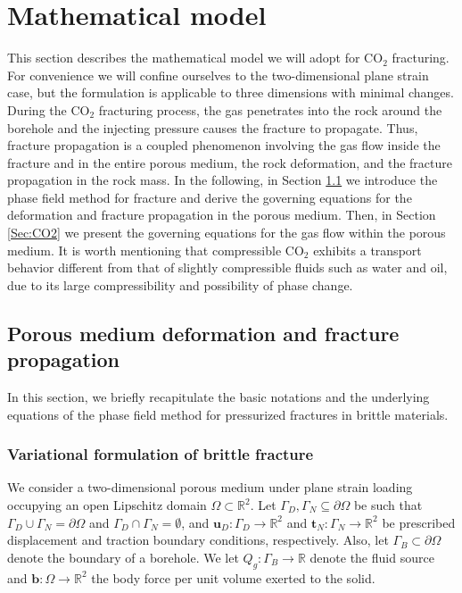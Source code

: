\section{Mathematical model}\label{sec:Math_model}
{This section describes the mathematical model we will adopt for CO$_2$ fracturing. For convenience we will confine ourselves to the two-dimensional plane strain case, but the formulation is applicable to three dimensions with minimal changes.}
During the CO$_2$ fracturing process, the gas penetrates into the rock around the borehole and the injecting pressure causes the fracture to propagate. Thus, fracture propagation is a coupled phenomenon involving the gas flow inside the fracture and in the entire porous medium, the rock deformation, and the fracture propagation in the rock mass. In the following, in Section \ref{Sec:Phase_Field} we introduce the phase field method for fracture and derive the governing equations for the deformation and fracture propagation in the porous medium. Then, in Section \ref{Sec:CO2} we present the governing equations for the gas flow within the porous medium. It is worth mentioning that compressible CO$_2$ exhibits a transport behavior different from that of slightly compressible fluids such as water and oil, due to its large compressibility and possibility of phase change.
\subsection{Porous medium deformation and fracture propagation}\label{Sec:Phase_Field}
In this section, 
we briefly recapitulate the basic notations and the underlying equations of the phase field method for pressurized fractures in brittle materials.

\subsubsection{Variational formulation of brittle fracture}
We consider a two-dimensional porous medium under plane strain loading occupying an open Lipschitz domain $\Omega\subset\mathbb{R}^2$. 
Let $\Gamma_D,\Gamma_N\subseteq \partial\Omega$ be such that $\Gamma_D\cup\Gamma_N=\partial\Omega$ and $\Gamma_D\cap\Gamma_N=\emptyset$, and $\bm{u}_D: \Gamma_D\rightarrow\mathbb{R}^2$ and $\bm{t}_N: \Gamma_N\rightarrow\mathbb{R}^2$ be prescribed displacement and traction boundary conditions, respectively. Also, let $\Gamma_B\subset \partial \Omega$ denote the boundary of a borehole. We let $Q_g:\Gamma_B\rightarrow\mathbb{R}$ denote the fluid source and $\mathbf{b}:\Omega\rightarrow\mathbb{R}^2$ the body force per unit volume exerted to the solid.

